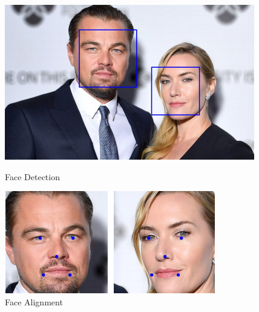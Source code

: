 \documentclass[12pt,english]{article}
\begin{document}
\begin{figure}[!tbp]
  \centering
  \begin{minipage}[b]{0.49\textwidth}
    \includegraphics[width=\textwidth]{figures/face_detection.png}
    \caption{Face Detection \cite{trigueros}}
    \label{fig:detect}
  \end{minipage}
  \hfill
  \begin{minipage}[b]{0.49\textwidth}
    \includegraphics[width=\textwidth]{figures/landmark.png}
    \caption{Face Alignment \cite{trigueros}}
    \label{fig:landmark}
  \end{minipage}
\end{figure}
\end{document}
